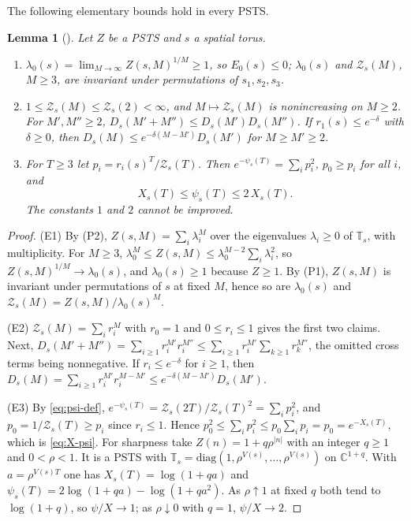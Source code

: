 \documentclass[11pt,a4paper]{amsart}
\newtheorem{lemma}[theorem]{Lemma}
\theoremstyle{definition}
\theoremstyle{remark}
\numberwithin{equation}{section}
\newcommand{\C}{\mathbb{C}}          %
\newcommand{\PSTS}{\textup{PSTS}}          %
\newcommand{\TT}{\mathbb{T}}               %
\newcommand{\Zpart}[2]{Z(#1,#2)}           %
\newcommand{\Zc}{\mathcal{Z}}              %
\newcommand{\Zs}[2]{\Zc_{#1}(#2)}          %
\newcommand{\XT}[2]{X_{#1}(#2)}            %
\newcommand{\Dexc}[2]{D_{#1}(#2)}          %
\newcommand{\psiT}[2]{\psi_{#1}(#2)}       %
\newcommand{\Vol}[1]{V(#1)}                %
\newcommand{\lzero}{\lambda_0}             %
\begin{document}
The following elementary bounds hold in every \PSTS{}.

\begin{lemma}[{\cite[Lemmas~15, 22 and 25]{bhattacharjee2026first}}]\label{lem:E1-E3}
Let $Z$ be a \PSTS{} and $s$ a spatial torus.
\begin{enumerate}[label=(E\arabic*),leftmargin=3em]
\item $\lzero(s)=\lim_{M\to\infty}\Zpart{s}{M}^{1/M}\ge1$, so $E_0(s)\le0$; $\lzero(s)$ and $\Zs{s}{M}$, $M\ge3$, are invariant under permutations of $s_1,s_2,s_3$.
\item $1\le\Zs{s}{M}\le\Zs{s}{2}<\infty$, and $M\mapsto\Zs{s}{M}$ is nonincreasing on $M\ge2$. For $M',M''\ge2$, $\Dexc{s}{M'+M''}\le\Dexc{s}{M'}\Dexc{s}{M''}$. If $r_1(s)\le e^{-\delta}$ with $\delta\ge0$, then $\Dexc{s}{M}\le e^{-\delta(M-M')}\Dexc{s}{M'}$ for $M\ge M'\ge2$.
\item For $T\ge3$ let $p_i=r_i(s)^T/\Zs{s}{T}$. Then $e^{-\psiT{s}{T}}=\sum_ip_i^2$, $p_0\ge p_i$ for all $i$, and
\begin{equation}\label{eq:X-psi}
\XT{s}{T}\le\psiT{s}{T}\le2\,\XT{s}{T}.
\end{equation}
The constants $1$ and $2$ cannot be improved.
\end{enumerate}
\end{lemma}

\begin{proof}
(E1) By (P2), $\Zpart{s}{M}=\sum_i\lambda_i^M$ over the eigenvalues $\lambda_i\ge0$ of $\TT_s$, with multiplicity. For $M\ge3$, $\lzero^M\le\Zpart{s}{M}\le\lzero^{M-2}\sum_i\lambda_i^2$, so $\Zpart{s}{M}^{1/M}\to\lzero(s)$, and $\lzero(s)\ge1$ because $Z\ge1$. By (P1), $\Zpart{s}{M}$ is invariant under permutations of $s$ at fixed $M$, hence so are $\lzero(s)$ and $\Zs{s}{M}=\Zpart{s}{M}/\lzero(s)^M$.

(E2) $\Zs{s}{M}=\sum_ir_i^M$ with $r_0=1$ and $0\le r_i\le1$ gives the first two claims. Next, $\Dexc{s}{M'+M''}=\sum_{i\ge1}r_i^{M'}r_i^{M''}\le\sum_{i\ge1}r_i^{M'}\sum_{k\ge1}r_k^{M''}$, the omitted cross terms being nonnegative. If $r_i\le e^{-\delta}$ for $i\ge1$, then $\Dexc{s}{M}=\sum_{i\ge1}r_i^{M'}r_i^{M-M'}\le e^{-\delta(M-M')}\Dexc{s}{M'}$.

(E3) By \eqref{eq:psi-def}, $e^{-\psiT{s}{T}}=\Zs{s}{2T}/\Zs{s}{T}^2=\sum_ip_i^2$, and $p_0=1/\Zs{s}{T}\ge p_i$ since $r_i\le1$. Hence $p_0^2\le\sum_ip_i^2\le p_0\sum_ip_i=p_0=e^{-\XT{s}{T}}$, which is \eqref{eq:X-psi}. For sharpness take $Z(n)=1+q\rho^{|n|}$ with an integer $q\ge1$ and $0<\rho<1$. It is a \PSTS{} with $\TT_s=\mathrm{diag}(1,\rho^{\Vol{s}},\dots,\rho^{\Vol{s}})$ on $\C^{1+q}$. With $a=\rho^{\Vol{s}T}$ one has $\XT{s}{T}=\log(1+qa)$ and $\psiT{s}{T}=2\log(1+qa)-\log(1+qa^2)$. As $\rho\uparrow1$ at fixed $q$ both tend to $\log(1+q)$, so $\psi/X\to1$; as $\rho\downarrow0$ with $q=1$, $\psi/X\to2$.
\end{proof}
\end{document}
